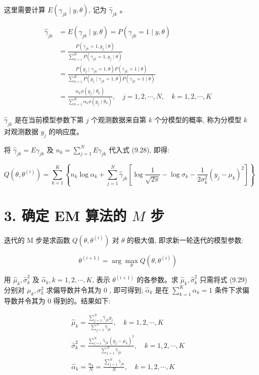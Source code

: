 \documentclass[10pt]{article}
\begin{document}
这里需要计算 $E\left(\gamma_{j k} \mid y, \theta\right)$, 记为 $\hat{\gamma}_{j k}$ 。

$$
\begin{aligned}
\hat{\gamma}_{j k} & =E\left(\gamma_{j k} \mid y, \theta\right)=P\left(\gamma_{j k}=1 \mid y, \theta\right) \\
& =\frac{P\left(\gamma_{j k}=1, y_{j} \mid \theta\right)}{\sum_{k=1}^{K} P\left(\gamma_{j k}=1, y_{j} \mid \theta\right)} \\
& =\frac{P\left(y_{j} \mid \gamma_{j k}=1, \theta\right) P\left(\gamma_{j k}=1 \mid \theta\right)}{\sum_{k=1}^{K} P\left(y_{j} \mid \gamma_{j k}=1, \theta\right) P\left(\gamma_{j k}=1 \mid \theta\right)} \\
& =\frac{\alpha_{k} \phi\left(y_{j} \mid \theta_{k}\right)}{\sum_{k=1}^{K} \alpha_{k} \phi\left(y_{j} \mid \theta_{k}\right)}, \quad j=1,2, \cdots, N, \quad k=1,2, \cdots, K
\end{aligned}
$$

$\hat{\gamma}_{j k}$ 是在当前模型参数下第 $j$ 个观测数据来自第 $k$ 个分模型的概率, 称为分模型 $k$ 对观测数据 $y_{j}$ 的响应度。

将 $\hat{\gamma}_{j k}=E \gamma_{j k}$ 及 $n_{k}=\sum_{j=1}^{N} E \gamma_{j k}$ 代入式 (9.28), 即得:


\begin{equation*}
Q\left(\theta, \theta^{(i)}\right)=\sum_{k=1}^{K}\left\{n_{k} \log \alpha_{k}+\sum_{j=1}^{N} \hat{\gamma}_{j k}\left[\log \frac{1}{\sqrt{2 \pi}}-\log \sigma_{k}-\frac{1}{2 \sigma_{k}^{2}}\left(y_{j}-\mu_{k}\right)^{2}\right]\right\} \tag{9.29}
\end{equation*}


\section*{3. 确定 EM 算法的 $M$ 步}
迭代的 $\mathrm{M}$ 步是求函数 $Q\left(\theta, \theta^{(i)}\right)$ 对 $\theta$ 的极大值, 即求新一轮迭代的模型参数:

$$
\theta^{(i+1)}=\arg \max _{\theta} Q\left(\theta, \theta^{(i)}\right)
$$

用 $\hat{\mu}_{k}, \hat{\sigma}_{k}^{2}$ 及 $\hat{\alpha}_{k}, k=1,2, \cdots, K$, 表示 $\theta^{(i+1)}$ 的各参数。求 $\hat{\mu}_{k}, \hat{\sigma}_{k}^{2}$ 只需将式 (9.29) 分别对 $\mu_{k}, \sigma_{k}^{2}$ 求偏导数并令其为 0 , 即可得到; $\hat{\alpha}_{k}$ 是在 $\sum_{k=1}^{K} \alpha_{k}=1$ 条件下求偏导数并令其为 0 得到的。结果如下:


\begin{gather*}
\hat{\mu}_{k}=\frac{\sum_{j=1}^{N} \hat{\gamma}_{j k} y_{j}}{\sum_{j=1}^{N} \hat{\gamma}_{j k}}, \quad k=1,2, \cdots, K  \tag{9.30}\\
\hat{\sigma}_{k}^{2}=\frac{\sum_{j=1}^{N} \hat{\gamma}_{j k}\left(y_{j}-\mu_{k}\right)^{2}}{\sum_{j=1}^{N} \hat{\gamma}_{j k}}, \quad k=1,2, \cdots, K  \tag{9.31}\\
\hat{\alpha}_{k}=\frac{n_{k}}{N}=\frac{\sum_{j=1}^{N} \hat{\gamma}_{j k}}{N}, \quad k=1,2, \cdots, K \tag{9.32}
\end{gather*}
\end{document}
